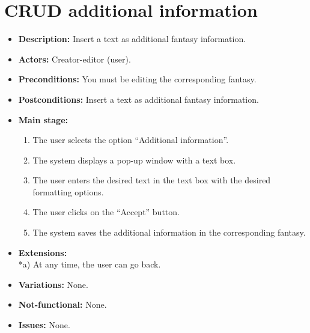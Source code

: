 \section{CRUD additional information}
\begin{itemize}
	\item \textbf{Description:} Insert a text as additional fantasy information.
	\item \textbf{Actors:} Creator-editor (user).
	\item \textbf{Preconditions:} You must be editing the corresponding fantasy.
	\item \textbf{Postconditions:} Insert a text as additional fantasy information.
	\item \textbf{Main stage:}
	\begin{enumerate}
		\item The user selects the option ``Additional information''.
		\item The system displays a pop-up window with a text box.
		\item The user enters the desired text in the text box with the desired formatting options.
		\item The user clicks on the ``Accept'' button.
		\item The system saves the additional information in the corresponding fantasy.
	\end{enumerate}
	\item \textbf{Extensions:} \\ *a) At any time, the user can go back.
	\item \textbf{Variations:} None.
	\item \textbf{Not-functional:} None.
	\item \textbf{Issues:} None.
\end{itemize}

